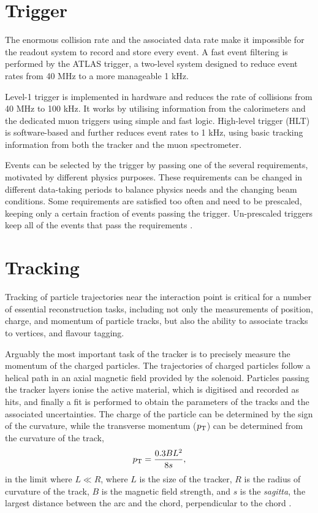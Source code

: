 \section{Trigger}

The enormous collision rate and the associated data rate make it
impossible for the readout system to record and store every event. A fast
event filtering is performed by the ATLAS trigger, a two-level system
designed to reduce event rates from 40 MHz to a more manageable 1 kHz.

Level-1 trigger is implemented in hardware and reduces the rate of
collisions from 40 MHz to 100 kHz. It works by utilising information
from the calorimeters and the dedicated muon triggers using simple
and fast logic. High-level trigger (HLT) is software-based and further
reduces event rates to 1 kHz, using basic tracking information from both
the tracker and the muon spectrometer.

Events can be selected by the trigger by passing one of the several
requirements, motivated by different physics purposes. These requirements
can be changed in different data-taking periods to balance physics needs
and the changing beam conditions. Some requirements are satisfied too
often and need to be prescaled, keeping only a certain fraction of events
passing the trigger. Un-prescaled triggers keep all of the events that
pass the requirements \cite{Aaboud:2016leb}.

\section{Tracking}

Tracking of particle trajectories near the interaction point is critical
for a number of essential reconstruction tasks, including not only
the measurements of position, charge, and momentum of particle tracks, but also
the ability to associate tracks to vertices, and flavour tagging.

Arguably the most important task of the tracker is to precisely measure
the momentum of the charged particles. The trajectories of charged
particles follow a helical path in an axial magnetic field provided
by the solenoid. Particles passing the tracker layers ionise the active material,
which is digitised and recorded as hits, and finally a fit is performed
to obtain the parameters of the tracks and the associated uncertainties.
The charge of the particle can be determined by the 
sign of the curvature, while the transverse momentum ($p_{\text{T}}$) can be
determined from the curvature of the track,
\begin{equation}
p_{\text{T}} = \frac{0.3 B L^2}{8s},
\end{equation}
in the limit where $L \ll R$, where $L$ is the size of the tracker,
$R$ is the radius of curvature of the track, $B$ is the magnetic field
strength, and $s$ is the \textit{sagitta}, the largest distance between
the arc and the chord, perpendicular to the chord \cite{Ragusa:2007zz}.

